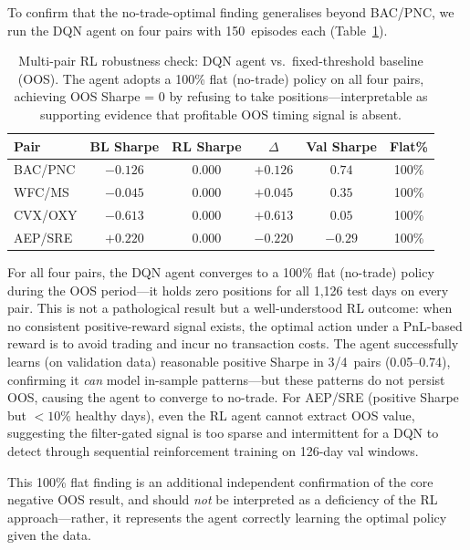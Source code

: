\documentclass{ieeeaccess}
\begin{document}
To confirm that the no-trade-optimal finding generalises beyond BAC/PNC, we run the DQN agent on four pairs with 150~episodes each (Table~\ref{tab:rl_multi_pair}).

\begin{table}[h]
\centering
\caption{Multi-pair RL robustness check: DQN agent vs.\ fixed-threshold baseline (OOS). The agent adopts a 100\% flat (no-trade) policy on all four pairs, achieving OOS Sharpe = 0 by refusing to take positions---interpretable as supporting evidence that profitable OOS timing signal is absent.}
\label{tab:rl_multi_pair}
\small
\begin{tabular}{lccccc}
\hline
\textbf{Pair} & \textbf{BL Sharpe} & \textbf{RL Sharpe} & \textbf{$\Delta$} & \textbf{Val Sharpe} & \textbf{Flat\%} \\
\hline
BAC/PNC & $-0.126$ & $0.000$ & $+0.126$ & $0.74$ & 100\% \\
WFC/MS  & $-0.045$ & $0.000$ & $+0.045$ & $0.35$ & 100\% \\
CVX/OXY & $-0.613$ & $0.000$ & $+0.613$ & $0.05$ & 100\% \\
AEP/SRE & $+0.220$ & $0.000$ & $-0.220$ & $-0.29$ & 100\% \\
\hline
\end{tabular}
\end{table}

For all four pairs, the DQN agent converges to a 100\% flat (no-trade) policy during the OOS period---it holds zero positions for all 1{,}126 test days on every pair.
This is not a pathological result but a well-understood RL outcome: when no consistent positive-reward signal exists, the optimal action under a PnL-based reward is to avoid trading and incur no transaction costs.
The agent successfully learns (on validation data) reasonable positive Sharpe in 3/4~pairs (0.05--0.74), confirming it \emph{can} model in-sample patterns---but these patterns do not persist OOS, causing the agent to converge to no-trade.
For AEP/SRE (positive Sharpe but $<10\%$ healthy days), even the RL agent cannot extract OOS value, suggesting the filter-gated signal is too sparse and intermittent for a DQN to detect through sequential reinforcement training on 126-day val windows.

This 100\% flat finding is an additional independent confirmation of the core negative OOS result, and should \emph{not} be interpreted as a deficiency of the RL approach---rather, it represents the agent correctly learning the optimal policy given the data.
\end{document}
